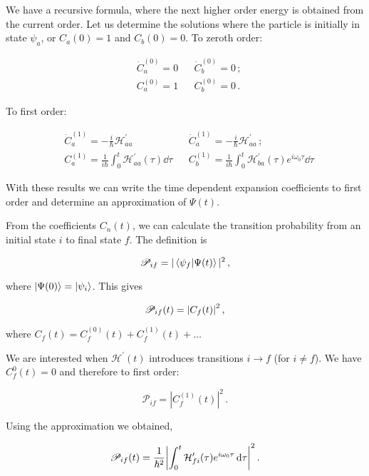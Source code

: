 \documentclass[12pt, titlepage]{article}
\begin{document}
We have a recursive formula, where the next higher order energy is obtained from the current order. Let us determine the solutions where the particle is initially in state $\psi_a$, or $C_a(0) = 1$ and $C_b(0)=0$. To zeroth order:

\begin{align}
	&\dot{C}_a^{(0)} = 0 &&\dot{C}_b^{(0)} = 0 \,; \nonumber \\[4pt]
    &C_{a}^{(0)} = 1 &&C_{b}^{(0)} = 0 \,.
\end{align}

To first order:

\begin{align}
	&\dot{C}_a^{(1)} = -\frac{i}{\hbar}\mathcal{H}^\prime_{aa} &&\dot{C}_a^{(1)} = -\frac{i}{\hbar}\mathcal{H}^\prime_{aa}\,; \nonumber \\[4pt]
	&C_{a}^{(1)} = \frac{1}{i\hbar}\int_{0}^{t} \mathcal{H}^\prime_{aa}(\tau)\dd{\tau}  &&C_{b}^{(1)} = \frac{1}{i\hbar}\int_{0}^{t} \mathcal{H}^\prime_{ba}(\tau)e^{i\omega_0 \tau}\dd{\tau} 
\end{align}

With these results we can write the time dependent expansion coefficients to first order and determine an approximation of $\Psi(t)$.

From the coefficients $C_n(t)$, we can calculate the transition probability from an initial state $i$ to final state $f$. The definition is

\begin{equation}
	\mathscr{P}_{if} = |\bra{\psi_f}\ket{\Psi(t)}|^2 \,,
\end{equation}

where $\ket{\Psi(0)} = \ket{\psi_i}$. This gives

\begin{equation}
	\mathscr{P}_{if}(t) = \qty|C_f(t)|^2 \,,
\end{equation}

where $C_f(t) = C_{f}^{(0)}(t) + C_f^{(1)}(t) + \ldots$

We are interested when $\mathcal{H}^\prime(t)$ introduces transitions $i \rightarrow f$ (for $i \neq f$). We have $C_f^{0}(t) = 0$ and therefore to first order:

\begin{equation}
	\mathcal{P}_{if} = |C_f^{(1)}(t)|^2\,.
\end{equation}

Using the approximation we obtained,

\begin{equation}
	\mathscr{P}_{if}(t) = \frac{1}{\hbar^2}\qty|\int_{0}^{t}\mathcal{H}^\prime_{fi}(\tau)e^{i\omega_0 \tau}\dd{\tau}|^2 \,.
\end{equation}
\end{document}
